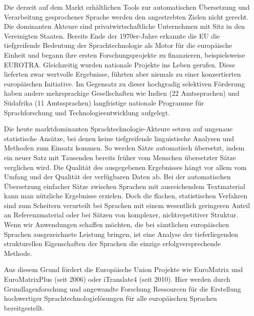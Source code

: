 \documentclass[]{../../metanetpaper}
\begin{document}
\begin{Parallel}[c]{79mm}{78mm}
{    
Die derzeit auf dem Markt erhältlichen Tools zur automatischen Übersetzung und Verarbeitung gesprochener Sprache werden den angestrebten Zielen nicht gerecht. Die dominanten Akteure sind privatwirtschaftliche Unternehmen mit Sitz in den Vereinigten Staaten. Bereits Ende der 1970er-Jahre erkannte die EU die tiefgreifende Bedeutung der Sprachtechnologie als Motor für die europäische Einheit und begann ihre ersten Forschungsprojekte zu finanzieren, beispielsweise EUROTRA. Gleichzeitig wurden nationale Projekte ins Leben gerufen. Diese lieferten zwar wertvolle Ergebnisse, führten aber niemals zu einer konzertierten europäischen Initiative. Im Gegensatz zu dieser hochgradig selektiven Förderung haben andere mehrsprachige Gesellschaften wie Indien (22 Amtssprachen) und Südafrika (11 Amtssprachen) langfristige nationale Programme für Sprachforschung und Technologieentwicklung aufgelegt. 

Die heute marktdominanten Sprach\-tech\-no\-logie-Ak\-teu\-re setzen auf ungenaue statistische Ansätze, bei denen keine tiefgreifende linguistische Analysen und Methoden zum Einsatz kommen. So werden Sätze automatisch übersetzt, indem ein neuer Satz mit Tausenden bereits früher vom Menschen übersetzter Sätze verglichen wird. Die Qualität des ausgegebenen Ergebnisses hängt vor allem vom Umfang und der Qualität der verfügbaren Daten ab. Bei der automatischen Übersetzung einfacher Sätze zwischen Sprachen mit ausreichendem Textmaterial kann man nützliche Ergebnisse erzielen. Doch die flachen, statistischen Verfahren sind zum Scheitern verurteilt bei Sprachen mit einem wesentlich geringeren Anteil an Referenzmaterial oder bei Sätzen von komplexer, nichtrepetitiver Struktur. Wenn wir Anwendungen schaffen möchten, die bei sämtlichen europäischen Sprachen ausgezeichnete Leistung bringen, ist eine Analyse der tieferliegenden strukturellen Eigenschaften der Sprachen die einzige erfolgversprechende Methode.

Aus diesem Grund fördert die Europäische Union Projekte wie EuroMatrix und EuroMatrixPlus (seit 2006) oder iTranslate4 (seit 2010). Hier werden durch Grundlagenforschung und angewandte Forschung Ressourcen für die Erstellung hochwertiger Sprachtechnologielösungen für alle europäischen Sprachen bereitgestellt. 

}
\end{Parallel}
\end{document}
